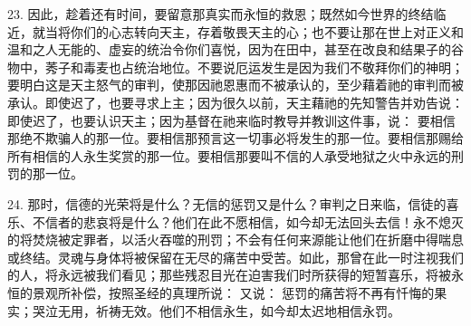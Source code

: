 23. 因此，趁着还有时间，要留意那真实而永恒的救恩；既然如今世界的终结临近，就当将你们的心志转向天主，存着敬畏天主的心；也不要让那在世上对正义和温和之人无能的、虚妄的统治令你们喜悦，因为在田中，甚至在改良和结果子的谷物中，莠子和毒麦也占统治地位。不要说厄运发生是因为我们不敬拜你们的神明；要明白这是天主怒气的审判，使那因祂恩惠而不被承认的，至少藉着祂的审判而被承认。即使迟了，也要寻求上主；因为很久以前，天主藉祂的先知警告并劝告说：  即使迟了，也要认识天主；因为基督在祂来临时教导并教训这件事，说：  要相信那绝不欺骗人的那一位。要相信那预言这一切事必将发生的那一位。要相信那赐给所有相信的人永生奖赏的那一位。要相信那要叫不信的人承受地狱之火中永远的刑罚的那一位。\par

24. 那时，信德的光荣将是什么？无信的惩罚又是什么？审判之日来临，信徒的喜乐、不信者的悲哀将是什么？他们在此不愿相信，如今却无法回头去信！永不熄灭的将焚烧被定罪者，以活火吞噬的刑罚；不会有任何来源能让他们在折磨中得喘息或终结。灵魂与身体将被保留在无尽的痛苦中受苦。如此，那曾在此一时注视我们的人，将永远被我们看见；那些残忍目光在迫害我们时所获得的短暂喜乐，将被永恒的景观所补偿，按照圣经的真理所说： 又说： 惩罚的痛苦将不再有忏悔的果实；哭泣无用，祈祷无效。他们不相信永生，如今却太迟地相信永罚。\par


